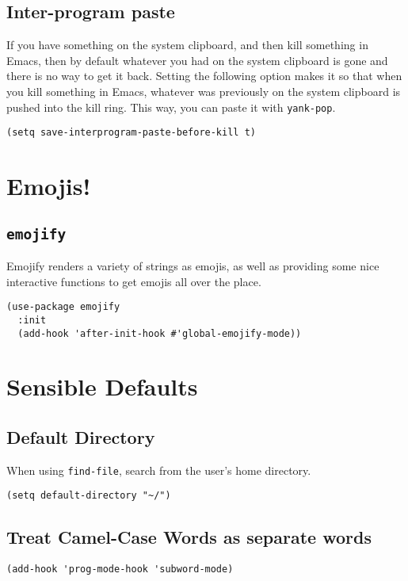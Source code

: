 \documentclass[11pt]{article}
\begin{document}
\subsection{Inter-program paste}
\label{sec:org2ba161d}
If you have something on the system clipboard, and then kill something
in Emacs, then by default whatever you had on the system clipboard is
gone and there is no way to get it back. Setting the following option
makes it so that when you kill something in Emacs, whatever was
previously on the system clipboard is pushed into the kill ring. This
way, you can paste it with \texttt{yank-pop}.
\begin{verbatim}
(setq save-interprogram-paste-before-kill t)
\end{verbatim}
\section{Emojis!}
\label{sec:orgffebb3e}
\subsection{\texttt{emojify}}
\label{sec:orge5211b3}
Emojify renders a variety of strings as emojis, as well as providing
some nice interactive functions to get emojis all over the place.

\begin{verbatim}
(use-package emojify
  :init
  (add-hook 'after-init-hook #'global-emojify-mode))
\end{verbatim}
\section{Sensible Defaults}
\label{sec:orgfdfd6f7}
\subsection{Default Directory}
\label{sec:orgb0d7d00}
When using \texttt{find-file}, search from the user's home directory.
\begin{verbatim}
(setq default-directory "~/")
\end{verbatim}

\subsection{Treat Camel-Case Words as separate words}
\label{sec:orgb61e7e7}
\begin{verbatim}
(add-hook 'prog-mode-hook 'subword-mode)
\end{verbatim}
\end{document}

